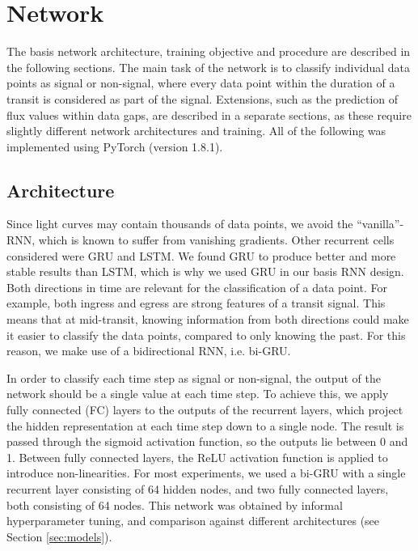 
\section{Network}
\label{sec:network}

The basis network architecture, training objective and procedure are described in the following sections. The main task of the network is to classify individual data points as signal or non-signal, where every data point within the duration of a transit is considered as part of the signal. Extensions, such as the prediction of flux values within data gaps, are described in a separate sections, as these require slightly different network architectures and training. All of the following was implemented using PyTorch (version 1.8.1).

\subsection{Architecture}
\label{sec:architecture}

Since light curves may contain thousands of data points, we avoid the ``vanilla''-RNN, which is known to suffer from vanishing gradients. Other recurrent cells considered were GRU and LSTM. We found GRU to produce better and more stable results than LSTM, which is why we used GRU in our basis RNN design. Both directions in time are relevant for the classification of a data point. For example, both ingress and egress are strong features of a transit signal. This means that at mid-transit, knowing information from both directions could make it easier to classify the data points, compared to only knowing the past. For this reason, we make use of a bidirectional RNN, i.e. bi-GRU.

In order to classify each time step as signal or non-signal, the output of the network should be a single value at each time step. To achieve this, we apply fully connected (FC) layers to the outputs of the recurrent layers, which project the hidden representation at each time step down to a single node. The result is passed through the sigmoid activation function, so the outputs lie between 0 and 1. Between fully connected layers, the ReLU activation function is applied to introduce non-linearities. For most experiments, we used a bi-GRU with a single recurrent layer consisting of 64 hidden nodes, and two fully connected layers, both consisting of 64 nodes. This network was obtained by informal hyperparameter tuning, and comparison against different architectures (see Section \ref{sec:models}).

